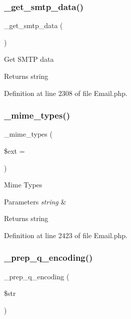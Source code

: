 \subsubsection{\texorpdfstring{\_get\_smtp\_data()}{\_get\_smtp\_data()}}
{\footnotesize\ttfamily \+\_\+get\+\_\+smtp\+\_\+data (\begin{DoxyParamCaption}{ }\end{DoxyParamCaption})\hspace{0.3cm}{\ttfamily [protected]}}

Get S\+M\+TP data

\begin{DoxyReturn}{Returns}
string 
\end{DoxyReturn}


Definition at line 2308 of file Email.\+php.

\mbox{\label{class_c_i___email_a7581ef570bb25b483e80ee996c42e454}} 
\subsubsection{\texorpdfstring{\_mime\_types()}{\_mime\_types()}}
{\footnotesize\ttfamily \+\_\+mime\+\_\+types (\begin{DoxyParamCaption}\item[{}]{\$ext = {\ttfamily \textquotesingle{}\textquotesingle{}} }\end{DoxyParamCaption})\hspace{0.3cm}{\ttfamily [protected]}}

Mime Types


\begin{DoxyParams}{Parameters}
{\em string} & \\
\hline
\end{DoxyParams}
\begin{DoxyReturn}{Returns}
string 
\end{DoxyReturn}


Definition at line 2423 of file Email.\+php.

\mbox{\label{class_c_i___email_a56a4d842c3dfe77bcb41082a82c5df24}} 
\subsubsection{\texorpdfstring{\_prep\_q\_encoding()}{\_prep\_q\_encoding()}}
{\footnotesize\ttfamily \+\_\+prep\+\_\+q\+\_\+encoding (\begin{DoxyParamCaption}\item[{}]{\$str }\end{DoxyParamCaption})\hspace{0.3cm}{\ttfamily [protected]}}

